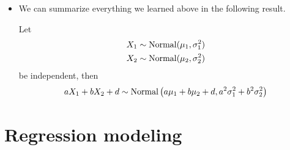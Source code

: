 \begin{itemize}
 \item  We can summarize everything we learned above in the following result. 
 \begin{thm}\label{thm:addingnormal}
Let
\begin{align*}
X_1 &\sim {\rm Normal}(\mu_1,\sigma_1^2)\\
X_2 &\sim {\rm Normal}(\mu_2,\sigma_2^2)
\end{align*}
be independent, then 
\begin{equation*}
aX_1+bX_2 + d \sim {\rm Normal}\left(a\mu_1+b\mu_2+d,a^2\sigma_1^2 + b^2\sigma_2^2\right)
\end{equation*}
 \end{thm}
\end{itemize}


\section{Regression modeling}


